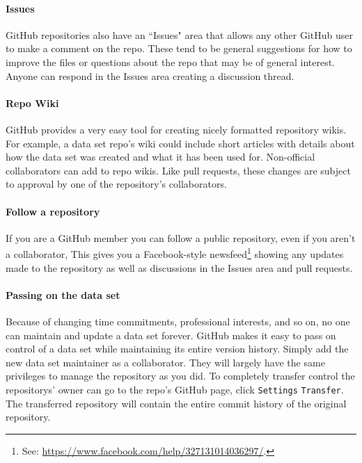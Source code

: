 \documentclass[twocolumn]{article}\usepackage{graphicx, color}
\begin{document}
\paragraph{Issues}

GitHub repositories also have an ``Issues" area that allows any other GitHub user to make a comment on the repo. These tend to be general suggestions for how to improve the files or questions about the repo that may be of general interest. Anyone can respond in the Issues area creating a discussion thread.

\paragraph{Repo Wiki}

GitHub provides a very easy tool for creating nicely formatted repository wikis. For example, a data set repo's wiki could include short articles with details about how the data set was created and what it has been used for. Non-official collaborators can add to repo wikis. Like pull requests, these changes are subject to approval by one of the repository's collaborators.

\paragraph{Follow a repository}

If you are a GitHub member you can follow a public repository, even if you aren't a collaborator, This gives you a Facebook-style newsfeed\footnote{See: \url{https://www.facebook.com/help/327131014036297/}.} showing any updates made to the repository as well as discussions in the Issues area and pull requests. 

\paragraph{Passing on the data set}

Because of changing time commitments, professional interests, and so on, no one can maintain and update a data set forever. GitHub makes it easy to pass on control of a data set while maintaining its entire version history. Simply add the new data set maintainer as a collaborator. They will largely have the same privileges to manage the repository as you did. To completely transfer control the repositorys' owner can go to the repo's GitHub page, click \texttt{Settings} \textrightarrow{} \texttt{Transfer}. The transferred repository will contain the entire commit history of the original repository.
\end{document}
